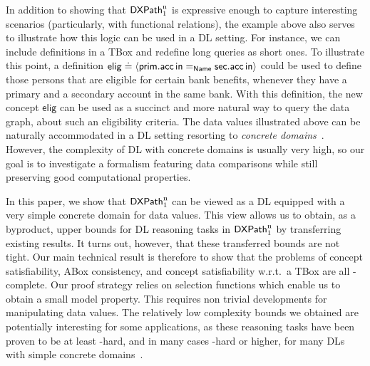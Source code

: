 In addition to showing that $\mathsf{DXPath}_{\rm 1}^{\rm n}$ is expressive enough to capture interesting scenarios (particularly, with functional relations), the example above also serves to illustrate how this logic can be used in a DL setting. For instance, we can include definitions in a TBox and redefine long queries as short ones. To illustrate this point, a definition $\mathsf{elig} \doteq \langle{\mathsf{prim.acc \, in} =_{\mathsf{Name}} \mathsf{sec.acc \, in }}\rangle$ could be used to define those persons that are eligible for certain bank benefits, whenever they have a primary and a secondary account in the same bank. With this definition, the new concept $\mathsf{elig}$ can be used as a succinct and more natural way to query the data graph, about such an eligibility criteria.
The data values illustrated above can be naturally accommodated in a DL setting resorting to \emph{concrete domains}~\cite{BaaderH91}. However, the complexity of DL with concrete domains is usually very high, so our goal is to investigate a formalism featuring data comparisons while still preserving good computational properties.

In this paper, we show that $\mathsf{DXPath}_{\rm 1}^{\rm n}$ can be viewed as a DL equipped with a very simple concrete domain for data values. This view allows us to obtain, as a byproduct, upper bounds for DL reasoning tasks in $\mathsf{DXPath}_{\rm 1}^{\rm n}$ by transferring existing results. It turns out, however, that these transferred bounds are not tight. Our main technical result is therefore to show that the problems of concept satisfiability, ABox consistency, and concept satisfiability w.r.t.\ a TBox are all \np-complete. Our proof strategy relies on selection functions which enable us to obtain a small model property. This requires non trivial developments for manipulating data values. The relatively low complexity bounds we obtained are potentially interesting for some applications, as these reasoning tasks have been proven to be at least \pspace-hard, and in many cases \exptime-hard or higher, for many DLs with simple concrete domains~\cite{Lutz1998-LUTDLW-2,Lutz02}.


